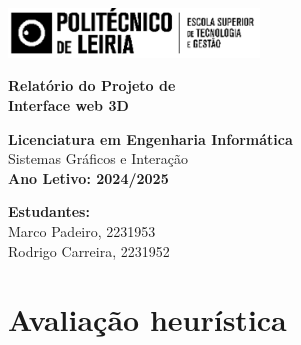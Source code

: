 \documentclass[a4paper,12pt]{article}
\begin{document}
\begin{titlepage}
    \begin{center}
        \includegraphics[width=0.5\textwidth]{logo_ipl.png}
    \end{center}

    \vspace{1cm}

    \begin{center}
        \fboxsep=10pt
        \parbox[c][3cm][c]{0.8\textwidth}{
            \centering
            \textbf{\Large Relatório do Projeto de}\\[0.3cm]
            \textbf{\Large Interface web 3D}
        }
    \end{center}

    \vfill

    \begin{center}
        \textbf{Licenciatura em Engenharia Informática}\\
        Sistemas Gráficos e Interação\\[0.5cm]
        \vspace{1cm}
        \textbf{Ano Letivo: 2024/2025}
    \end{center}

    \vfill

    \begin{center}
        \textbf{Estudantes:}\\[0.3cm]
        Marco Padeiro, 2231953\\
        Rodrigo Carreira, 2231952
    \end{center}
    \thispagestyle{plain}
\end{titlepage}

\newpage
\tableofcontents

\newpage
\section{Avaliação heurística}
\end{document}
